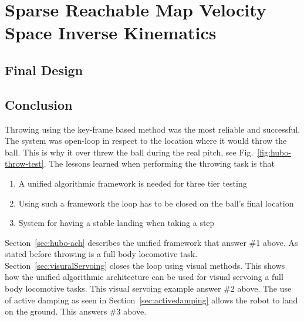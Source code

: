 \chapter{Sparse Reachable Map Velocity Space Inverse Kinematics}\label{sec:srm}
		
		


\section{Final Design}\label{sec:finalDesign}
	

\section{Conclusion}\label{sec:throw:conclusion}
	Throwing using the key-frame based method was the most reliable and successful.  
	The system was open-loop in respect to the location where it would throw the ball.
	This is why it over threw the ball during the real pitch, see Fig.~\ref{fig:hubo-throw-test}.
	The lessons learned when performing the throwing task is that
	\begin{enumerate}
		\item A unified algorithmic framework is needed for three tier testing
		\item Using such a framework the loop has to be closed on the ball's final location
		\item System for having a stable landing when taking a step
	\end{enumerate}

	Section~\ref{sec:hubo-ach} describes the unified framework that answer \#1 above.
	As stated before throwing is a full body locomotive task. 
	Section~\ref{sec:visuralServoing} closes the loop using visual methods.
	This shows how the unified algorithmic architecture can be used for visual servoing a full body locomotive tasks.
	This visual servoing example answer \#2 above.
	The use of active damping as seen in Section~\ref{sec:activedamping} allows the robot to land on the ground.
	This answers \#3 above.


